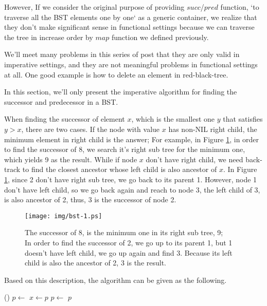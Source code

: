 \documentclass{article}
\begin{document}
However, If we consider
the original purpose of providing $succ$/$pred$ function, `to traverse all the
BST elements one by one` as a generic container, we realize
that they don't make significant sense in functional settings because
we can traverse the tree in increase order by $map$ function we defined
previously.

We'll meet many problems in this series of post that they are only valid
in imperative settings, and they are not meaningful problems in functional
settings at all. One good example is how to delete an element in
red-black-tree\cite{okasaki-blog}.

In this section, we'll only present the imperative algorithm for finding
the successor and predecessor in a BST.

When finding the successor of element $x$, which is the smallest one $y$
that satisfies $y > x$, there are two cases. If the node with value $x$
has non-NIL right child, the minimum element in right child is the answer;
For example, in Figure \ref{fig:bst-succ}, in order to find the successor
of 8, we search it's right sub tree for the minimum one, which yields 9
as the result. While if node $x$ don't have right child, we need
back-track to find the closest ancestor whose left child is also ancestor
of $x$. In Figure \ref{fig:bst-succ}, since 2 don't have right sub tree,
we go back to its parent 1. However, node 1 don't have left child, so we
go back again and reach to node 3, the left child of 3, is also ancestor
of 2, thus, 3 is the successor of node 2.

\begin{figure}[htbp]
  \centering
  \texttt{[image: img/bst-1.ps]}
  \caption{The successor of 8, is the minimum one in its right sub tree, 9; \\
           In order to find the successor of 2, we go up to its parent 1, but 1 doesn't have left child, we go up again and find 3. Because its left child is also the ancestor of 2, 3 is the result.} \label{fig:bst-succ}
\end{figure}

Based on this description, the algorithm can be given as the following.

\begin{algorithmic}[1]
    \State \Return {}()
  \Else
    \State $p \gets $ 
      \State $x \gets p$
      \State $p \gets $ 
    \EndWhile
    \State \Return $p$
  \EndIf
\EndFunction
\end{algorithmic}
\end{document}
